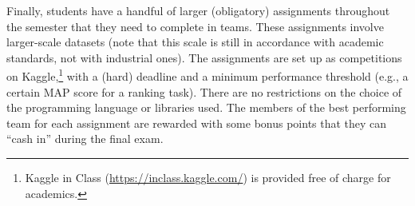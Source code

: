 Finally, students have a handful of larger (obligatory) assignments throughout the semester that they need to complete in teams.  These assignments involve larger-scale datasets (note that this scale is still in accordance with academic standards, not with industrial ones).  The assignments are set up as competitions on Kaggle,\footnote{Kaggle in Class (\url{https://inclass.kaggle.com/}) is provided free of charge for academics.} with a (hard) deadline and a minimum performance threshold (e.g., a certain MAP score for a ranking task).  There are no restrictions on the choice of the programming language or libraries used.  The members of the best performing team for each assignment are rewarded with some bonus points that they can ``cash in'' during the final exam.\\

